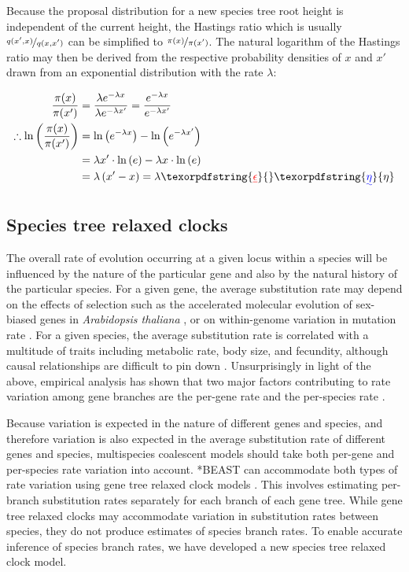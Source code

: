 \documentclass[12pt]{article}
\providecommand{\DIFaddtex}[1]{{\protect\color{blue}\uwave{#1}}} %
\providecommand{\DIFdeltex}[1]{{\protect\color{red}\sout{#1}}}                      %
\providecommand{\DIFaddbegin}{} %
\providecommand{\DIFaddend}{} %
\providecommand{\DIFdelbegin}{} %
\providecommand{\DIFdelend}{} %
\providecommand{\DIFadd}[1]{\texorpdfstring{\DIFaddtex{#1}}{#1}} %
\providecommand{\DIFdel}[1]{\texorpdfstring{\DIFdeltex{#1}}{}} %
\begin{document}
Because the proposal distribution for a new species tree root height is
independent of the current height, the Hastings ratio which is usually
$\nicefrac{q(x',x)}{q(x,x')}$ \citep{Hastings1970} can be simplified to
$\nicefrac{\pi(x)}{\pi(x')}$. The natural logarithm of the Hastings ratio may then
be derived from the respective probability densities of $x$ and
$x'$ drawn from an exponential distribution with the rate $\lambda$:

\begin{align}
\frac{\pi(x)}{\pi(x')} &= \frac{\lambda e^{-\lambda x}}{\lambda e^{-\lambda x'}} = \frac{e^{-\lambda x}}{e^{-\lambda x'}}\\
\therefore \ln\left(\frac{\pi(x)}{\pi(x')}\right) &= \ln \left(e^{-\lambda x}\right) - \ln \left(e^{-\lambda x'}\right)\\
& = \lambda x' \cdot \ln \left(e\right) - \lambda x \cdot \ln \left(e\right)\\
& = \lambda \left(x' - x\right) = \lambda \DIFdelbegin \DIFdel{\epsilon
}\DIFdelend \DIFaddbegin \DIFadd{\eta
}\DIFaddend \end{align}

\subsection{Species tree relaxed clocks}

The overall rate of evolution occurring at a given locus within a species will
be influenced by the nature of the particular gene and also by the natural
history of the particular species. For a given gene, the average substitution
rate may depend on the effects of selection such as the accelerated molecular
evolution of sex-biased genes in \textit{Arabidopsis thaliana}
\citep{Gossmann01032014}, or on within-genome variation in mutation rate \citep{Baer2007}.
For a given species, the average substitution rate is correlated with a
multitude of traits including metabolic rate, body size, and fecundity, although
causal relationships are difficult to pin down \citep{Bromham2503}.
Unsurprisingly in light of the above, empirical analysis has shown that two
major factors contributing to rate variation among gene branches are the
per-gene rate and the per-species rate \citep{Rasmussen01122007}.

Because variation is expected in the nature of different genes and species, and
therefore variation is also expected in the average substitution rate of different
genes and species, multispecies coalescent models should take both per-gene and
per-species rate variation into account. *BEAST can accommodate both types of
rate variation using gene tree relaxed clock models \citep[for examples see][]{Berv2014120, Lambert2015146}.
This involves estimating per-branch substitution rates separately
for each branch of each gene tree. While gene tree relaxed clocks may
accommodate variation in substitution rates between species, they do not produce
estimates of species branch rates. To enable accurate inference of species
branch rates, we have developed a new species tree relaxed clock model.
\end{document}
